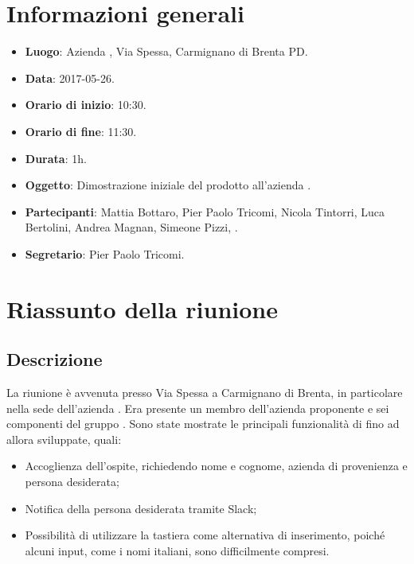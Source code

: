 \documentclass[a4paper,titlepage]{article}
\begin{document}
		
		\maketitle
		\begin{diario}
		\end{diario}
		\newpage
		\tableofcontents
		
		\newpage
		\section{Informazioni generali}
		\label{sec:Informazioni}
		
		\begin{itemize}
			\item \textbf{Luogo}: Azienda \PROPONENTE, Via Spessa, Carmignano di Brenta PD.
			\item \textbf{Data}: 2017-05-26.
			\item \textbf{Orario di inizio}: 10:30.
			\item \textbf{Orario di fine}: 11:30.
			\item \textbf{Durata}: 1h.
			\item \textbf{Oggetto}: Dimostrazione iniziale del prodotto \PROGETTO{} all'azienda \PROPONENTE.
			\item \textbf{Partecipanti}: Mattia Bottaro, Pier Paolo Tricomi, Nicola Tintorri, Luca Bertolini, Andrea Magnan, Simeone Pizzi, \PROPONENTE.
			\item \textbf{Segretario}: Pier Paolo Tricomi.
			
		\end{itemize}
		\section{Riassunto della riunione}
		\label{sec:RiassuntoRiunione}
		\subsection{Descrizione}
		La riunione è avvenuta presso Via Spessa a Carmignano di Brenta, in particolare nella sede dell'azienda \PROPONENTE. Era presente un membro dell'azienda proponente e sei componenti del gruppo \GRUPPO{}. Sono state mostrate le principali funzionalità di \PROGETTO{} fino ad allora sviluppate, quali:
		\begin{itemize}
			\item Accoglienza dell'ospite, richiedendo nome e cognome, azienda di provenienza e persona desiderata;
			\item Notifica della persona desiderata tramite Slack;
			\item Possibilità di utilizzare la tastiera come alternativa di inserimento, poiché alcuni input, come i nomi italiani, sono difficilmente compresi.
		\end{itemize}
		
\end{document}
